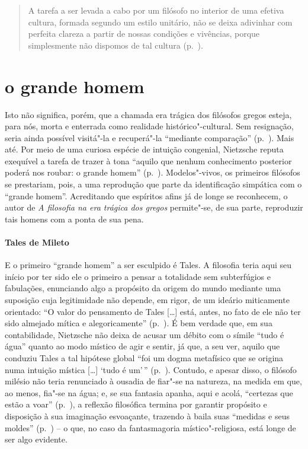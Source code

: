 \begin{quote} 
A tarefa a ser levada a cabo por um filósofo no interior de
 uma efetiva cultura, formada segundo um estilo unitário, não se deixa
 adivinhar com perfeita clareza a partir de nossas condições e vivências,
 porque simplesmente não dispomos de tal cultura (p.~\pageref{tarefaaserlevada}).
\end{quote} 

\section{o grande homem} 

Isto não significa, porém, que a chamada era trágica dos filósofos gregos 
esteja, para nós, morta e enterrada como realidade
 histórico"-cultural. Sem resignação, seria ainda possível visitá"-la e
 recuperá"-la ``mediante comparação'' (p.~\pageref{comparacao}). Mais até.
 Por meio de uma curiosa espécie de intuição congenial, Nietzsche reputa
 exequível a tarefa de trazer à tona ``aquilo que nenhum conhecimento
 posterior poderá nos roubar: o grande homem'' (p.~\pageref{ograndehomem}). 
 Modelos"-vivos, os primeiros filósofos se prestariam, pois,
 a uma reprodução que parte da identificação simpática com o ``grande
 homem''. Acreditando que espíritos afins já de longe se reconhecem, o autor
 de \textit{A filosofia na era trágica dos gregos} permite"-se, de sua parte,
 reproduzir tais homens com a ponta de sua pena.

\paragraph{Tales de Mileto} E o primeiro ``grande homem'' a ser esculpido é
 Tales. A filosofia teria aqui seu início por ter sido ele o primeiro a
 pensar a totalidade sem subterfúgios e fabulações, enunciando algo a
 propósito da origem do mundo mediante uma suposição cuja legitimidade não
 depende, em rigor, de um ideário miticamente orientado: ``O valor do
 pensamento de Tales [\ldots] está, antes, no fato de ele não ter sido
 almejado mítica e alegoricamente'' (p.~\pageref{pensamentodetales}). É bem
 verdade que, em sua contabilidade, Nietzsche não deixa de acusar um débito
 com o símile ``tudo é água'' quanto ao modo místico de agir e sentir, já
 que, a seu ver, aquilo que conduziu Tales a tal hipótese global ``foi um
 dogma metafísico que se origina numa intuição mística [\ldots] `tudo é
 um'\,'' (p.~\pageref{foiumdogma}). Contudo, e apesar disso, o filósofo
 milésio não teria renunciado à ousadia de fiar"-se na natureza, na medida em
 que, ao menos, fia"-se na água; e, se sua fantasia apanha, aqui e acolá,
 ``certezas que estão a voar'' (p.~\pageref{certezasque}), a reflexão
 filosófica termina por garantir propósito e disposição à sua imaginação
 esvoaçante, trazendo à baila suas ``medidas e seus moldes'' 
 (p.~\pageref{medidaseseusmoldes}) -- o que, no caso da fantasmagoria místico"-religiosa,
 está longe de ser algo evidente.

